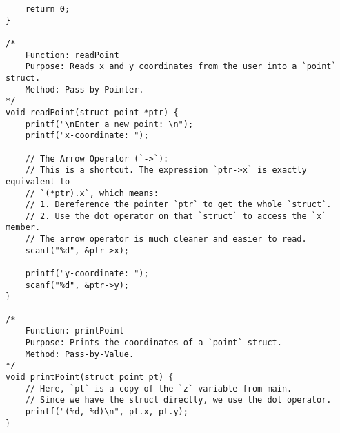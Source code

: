 \documentclass[11pt]{book}
\begin{document}
\begin{verbatim}
    return 0;
}

/*
    Function: readPoint
    Purpose: Reads x and y coordinates from the user into a `point` struct.
    Method: Pass-by-Pointer.
*/
void readPoint(struct point *ptr) {
    printf("\nEnter a new point: \n");
    printf("x-coordinate: ");

    // The Arrow Operator (`->`):
    // This is a shortcut. The expression `ptr->x` is exactly equivalent to
    // `(*ptr).x`, which means:
    // 1. Dereference the pointer `ptr` to get the whole `struct`.
    // 2. Use the dot operator on that `struct` to access the `x` member.
    // The arrow operator is much cleaner and easier to read.
    scanf("%d", &ptr->x);

    printf("y-coordinate: ");
    scanf("%d", &ptr->y);
}

/*
    Function: printPoint
    Purpose: Prints the coordinates of a `point` struct.
    Method: Pass-by-Value.
*/
void printPoint(struct point pt) {
    // Here, `pt` is a copy of the `z` variable from main.
    // Since we have the struct directly, we use the dot operator.
    printf("(%d, %d)\n", pt.x, pt.y);
}

\end{verbatim}
\clearpage
\end{document}
